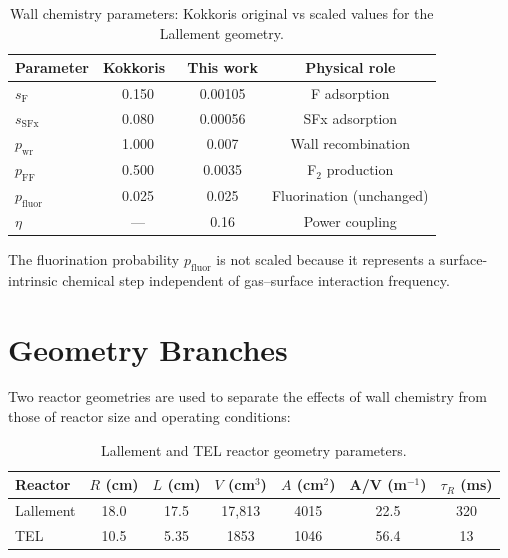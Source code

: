 \documentclass[11pt,a4paper]{report}
\begin{document}
\begin{table}[H]
\centering
\caption{Wall chemistry parameters: Kokkoris original vs scaled values for the Lallement geometry.}
\label{tab:wall_params}
\small
\begin{tabular}{lccc}
\toprule
Parameter & Kokkoris~\cite{Kokkoris2009} & This work & Physical role \\
\midrule
$s_\mathrm{F}$ & 0.150 & 0.00105 & F adsorption \\
$s_\mathrm{SFx}$ & 0.080 & 0.00056 & SFx adsorption \\
$p_\mathrm{wr}$ & 1.000 & 0.007 & Wall recombination \\
$p_\mathrm{FF}$ & 0.500 & 0.0035 & F$_2$ production \\
$p_\mathrm{fluor}$ & 0.025 & 0.025 & Fluorination (unchanged) \\
$\eta$ & --- & 0.16 & Power coupling \\
\bottomrule
\end{tabular}
\end{table}

The fluorination probability $p_\mathrm{fluor}$ is not scaled because it represents a surface-intrinsic chemical step independent of gas--surface interaction frequency.

\section{Geometry Branches}
\label{sec:wall_geometry}

Two reactor geometries are used to separate the effects of wall chemistry from those of reactor size and operating conditions:

\begin{table}[H]
\centering
\caption{Lallement and TEL reactor geometry parameters.}
\label{tab:wall_geometry}
\begin{tabular}{lcccccc}
\toprule
Reactor & $R$ (cm) & $L$ (cm) & $V$ (cm$^3$) & $A$ (cm$^2$) & A/V (m$^{-1}$) & $\tau_R$ (ms) \\
\midrule
Lallement & 18.0 & 17.5 & 17{,}813 & 4015 & 22.5 & 320 \\
TEL & 10.5 & 5.35 & 1853 & 1046 & 56.4 & 13 \\
\bottomrule
\end{tabular}
\end{table}
\end{document}
